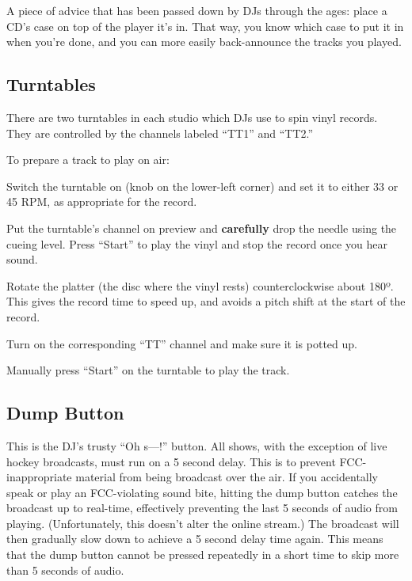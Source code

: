 \documentclass{witrman}
\begin{document}
A piece of advice that has been passed down by DJs through the ages: place a
CD's case on top of the player it's in.  That way, you know which case to put it
in when you're done, and you can more easily back-announce the tracks you played.

\subsection{Turntables}

There are two turntables in each studio which DJs use to spin vinyl records.
They are controlled by the channels labeled ``TT1'' and ``TT2.''


To prepare a track to play on air:
\begin{skinnyenumerate}
    \item Switch the turntable on (knob on the lower-left corner) and set it to
        either 33 or 45 RPM, as appropriate for the record.
    \item Put the turntable's channel on preview and \textbf{carefully} drop the
        needle using the cueing level.  Press ``Start'' to play the vinyl and
        stop the record once you hear sound.
    \item Rotate the platter (the disc where the vinyl rests) counterclockwise
        about 180º.  This gives the record time to speed up, and avoids a pitch
        shift at the start of the record.
    \item Turn on the corresponding ``TT'' channel and make sure it is potted
        up.
    \item Manually press ``Start'' on the turntable to play the track.
\end{skinnyenumerate}

\subsection{Dump Button}

This is the DJ's trusty ``Oh s---!'' button.  All shows, with the exception of
live hockey broadcasts, must run on a 5 second delay.  This is to prevent
FCC-inappropriate material from being broadcast over the air.  If you
accidentally speak or play an FCC-violating sound bite, hitting the dump button
catches the broadcast up to real-time, effectively preventing the last 5 seconds
of audio from playing.  (Unfortunately, this doesn't alter the online stream.)
The broadcast will then gradually slow down to achieve a 5 second delay time
again.  This means that the dump button cannot be pressed repeatedly in a short
time to skip more than 5 seconds of audio.
\end{document}
